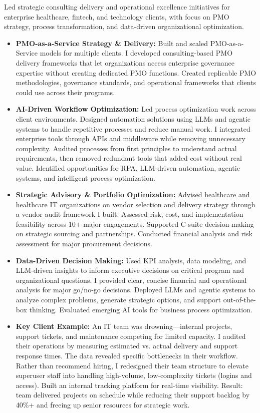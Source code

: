 \documentclass[10pt,letterpaper]{article}
\begin{document}
Led strategic consulting delivery and operational excellence initiatives for enterprise healthcare, fintech, and technology clients, with focus on PMO strategy, process transformation, and data-driven organizational optimization.

\begin{itemize}
\item \textbf{PMO-as-a-Service Strategy \& Delivery:} Built and scaled PMO-as-a-Service models for multiple clients. I developed consulting-based PMO delivery frameworks that let organizations access enterprise governance expertise without creating dedicated PMO functions. Created replicable PMO methodologies, governance standards, and operational frameworks that clients could use across their programs.

\item \textbf{AI-Driven Workflow Optimization:} Led process optimization work across client environments. Designed automation solutions using LLMs and agentic systems to handle repetitive processes and reduce manual work. I integrated enterprise tools through APIs and middleware while removing unnecessary complexity. Audited processes from first principles to understand actual requirements, then removed redundant tools that added cost without real value. Identified opportunities for RPA, LLM-driven automation, agentic systems, and intelligent process optimization.

\item \textbf{Strategic Advisory \& Portfolio Optimization:} Advised healthcare and healthcare IT organizations on vendor selection and delivery strategy through a vendor audit framework I built. Assessed risk, cost, and implementation feasibility across 10+ major engagements. Supported C-suite decision-making on strategic sourcing and partnerships. Conducted financial analysis and risk assessment for major procurement decisions.

\item \textbf{Data-Driven Decision Making:} Used KPI analysis, data modeling, and LLM-driven insights to inform executive decisions on critical program and organizational questions. I provided clear, concise financial and operational analysis for major go/no-go decisions. Deployed LLMs and agentic systems to analyze complex problems, generate strategic options, and support out-of-the-box thinking. Evaluated emerging AI tools for business process optimization.

\item \textbf{Key Client Example:} An IT team was drowning---internal projects, support tickets, and maintenance competing for limited capacity. I audited their operations by measuring estimated vs. actual delivery and support response times. The data revealed specific bottlenecks in their workflow. Rather than recommend hiring, I redesigned their team structure to elevate superuser staff into handling high-volume, low-complexity tickets (logins and access). Built an internal tracking platform for real-time visibility. Result: team delivered projects on schedule while reducing their support backlog by 40\%+ and freeing up senior resources for strategic work.
\end{itemize}
\end{document}
